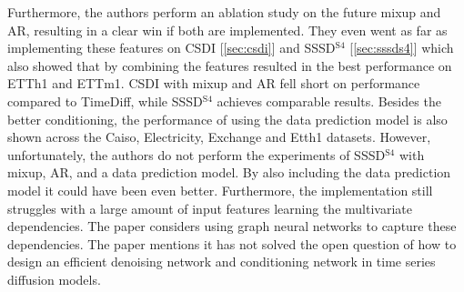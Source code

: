 Furthermore, the authors perform an ablation study on the future mixup and AR, resulting in a clear win if both are implemented. They even went as far as implementing these features on CSDI [\ref{sec:csdi}] and SSSD$^{\text{S4}}$ [\ref{sec:sssds4}] which also showed that by combining the features resulted in the best performance on ETTh1 and ETTm1. CSDI with mixup and AR fell short on performance compared to TimeDiff, while SSSD$^{\text{S4}}$ achieves comparable results.
Besides the better conditioning, the performance of using the data prediction model is also shown across the Caiso, Electricity, Exchange and Etth1 datasets. 
However, unfortunately, the authors do not perform the experiments of SSSD$^{\text{S4}}$ with mixup, AR, and a data prediction model. By also including the data prediction model it could have been even better.
Furthermore, the implementation still struggles with a large amount of input features learning the multivariate dependencies. The paper considers using graph neural networks to capture these dependencies.
The paper mentions it has not solved the open question of how to design an efficient denoising network and conditioning network in time series diffusion models.